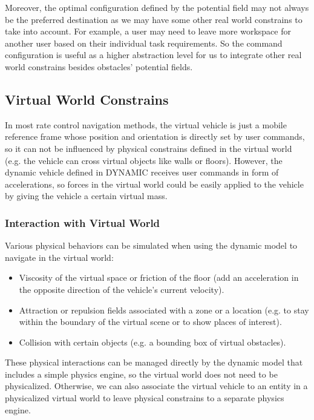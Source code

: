 Moreover, the optimal configuration defined by the potential field may not always be the preferred destination as we may have some other real world constrains to take into account. For example, a user may need to leave more workspace for another user based on their individual task requirements. So the command configuration is useful as a higher abstraction level for us to integrate other real world constrains besides obstacles' potential fields. 


\subsection{Virtual World Constrains}
In most rate control navigation methods, the virtual vehicle is just a mobile reference frame whose position and orientation is directly set by user commands, so it can not be influenced by physical constrains defined in the virtual world (e.g. the vehicle can cross virtual objects like walls or floors). However, the dynamic vehicle defined in DYNAMIC receives user commands in form of accelerations, so forces in the virtual world could be easily applied to the vehicle by giving the vehicle a certain virtual mass.

\subsubsection{Interaction with Virtual World}
Various physical behaviors can be simulated when using the dynamic model to navigate in the virtual world:

\begin{itemize}
\item Viscosity of the virtual space or friction of the floor (add an acceleration in the opposite direction of the vehicle's current velocity).
\item Attraction or repulsion fields associated with a zone or a location (e.g. to stay within the boundary of the virtual scene or to show places of interest).
\item Collision with certain objects (e.g. a bounding box of virtual obstacles).
\end{itemize}

These physical interactions can be managed directly by the dynamic model that includes a simple physics engine, so the virtual world does not need to be physicalized. Otherwise, we can also associate the virtual vehicle to an entity in a physicalized virtual world to leave physical constrains to a separate physics engine.

